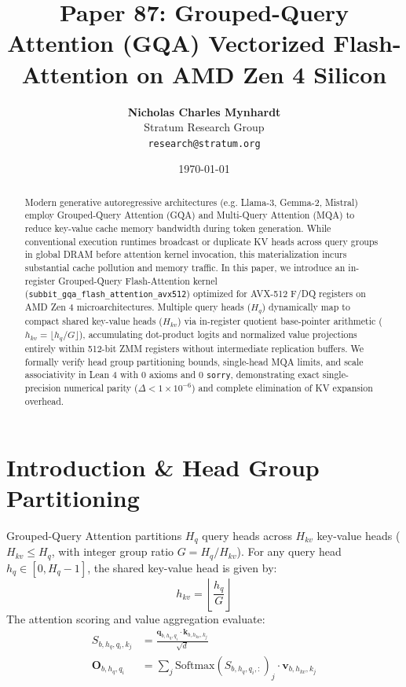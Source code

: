 \documentclass[11pt,a4paper]{article}
\title{\textbf{Paper 87: Grouped-Query Attention (GQA) Vectorized Flash-Attention on AMD Zen 4 Silicon}}
\author{\textbf{Nicholas Charles Mynhardt} \\ Stratum Research Group \\ \texttt{research@stratum.org}}
\date{\today}
\begin{document}
\maketitle

\begin{abstract}
Modern generative autoregressive architectures (e.g. Llama-3, Gemma-2, Mistral) employ Grouped-Query Attention (GQA) and Multi-Query Attention (MQA) to reduce key-value cache memory bandwidth during token generation. While conventional execution runtimes broadcast or duplicate KV heads across query groups in global DRAM before attention kernel invocation, this materialization incurs substantial cache pollution and memory traffic. In this paper, we introduce an in-register Grouped-Query Flash-Attention kernel (\texttt{subbit\_gqa\_flash\_attention\_avx512}) optimized for AVX-512 F/DQ registers on AMD Zen 4 microarchitectures. Multiple query heads ($H_q$) dynamically map to compact shared key-value heads ($H_{kv}$) via in-register quotient base-pointer arithmetic ($h_{kv} = \lfloor h_q / G \rfloor$), accumulating dot-product logits and normalized value projections entirely within 512-bit ZMM registers without intermediate replication buffers. We formally verify head group partitioning bounds, single-head MQA limits, and scale associativity in Lean 4 with 0 axioms and 0 \texttt{sorry}, demonstrating exact single-precision numerical parity ($\Delta < 1 \times 10^{-6}$) and complete elimination of KV expansion overhead.
\end{abstract}

\section{Introduction \& Head Group Partitioning}
Grouped-Query Attention partitions $H_q$ query heads across $H_{kv}$ key-value heads ($H_{kv} \le H_q$, with integer group ratio $G = H_q / H_{kv}$).
For any query head $h_q \in [0, H_q - 1]$, the shared key-value head is given by:
\begin{equation}
h_{kv} = \left\lfloor \frac{h_q}{G} \right\rfloor
\end{equation}
The attention scoring and value aggregation evaluate:
\begin{align}
S_{b, h_q, q_i, k_j} &= \frac{\mathbf{q}_{b, h_q, q_i} \cdot \mathbf{k}_{b, h_{kv}, k_j}}{\sqrt{d}} \\
\mathbf{O}_{b, h_q, q_i} &= \sum_j \text{Softmax}(S_{b, h_q, q_i, :})_j \cdot \mathbf{v}_{b, h_{kv}, k_j}
\end{align}
\end{document}
